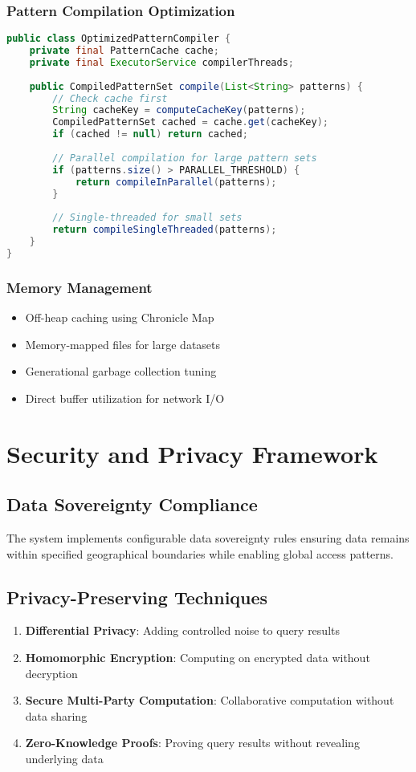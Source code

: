 \documentclass[11pt,a4paper]{article}
\begin{document}
\subsubsection{Pattern Compilation Optimization}
\begin{lstlisting}[language=Java, caption=Optimized Pattern Compilation]
public class OptimizedPatternCompiler {
    private final PatternCache cache;
    private final ExecutorService compilerThreads;
    
    public CompiledPatternSet compile(List<String> patterns) {
        // Check cache first
        String cacheKey = computeCacheKey(patterns);
        CompiledPatternSet cached = cache.get(cacheKey);
        if (cached != null) return cached;
        
        // Parallel compilation for large pattern sets
        if (patterns.size() > PARALLEL_THRESHOLD) {
            return compileInParallel(patterns);
        }
        
        // Single-threaded for small sets
        return compileSingleThreaded(patterns);
    }
}
\end{lstlisting}

\subsubsection{Memory Management}
\begin{itemize}
\item Off-heap caching using Chronicle Map
\item Memory-mapped files for large datasets
\item Generational garbage collection tuning
\item Direct buffer utilization for network I/O
\end{itemize}

\section{Security and Privacy Framework}

\subsection{Data Sovereignty Compliance}
The system implements configurable data sovereignty rules ensuring data remains within specified geographical boundaries while enabling global access patterns.

\subsection{Privacy-Preserving Techniques}
\begin{enumerate}
\item \textbf{Differential Privacy}: Adding controlled noise to query results
\item \textbf{Homomorphic Encryption}: Computing on encrypted data without decryption
\item \textbf{Secure Multi-Party Computation}: Collaborative computation without data sharing
\item \textbf{Zero-Knowledge Proofs}: Proving query results without revealing underlying data
\end{enumerate}
\end{document}
